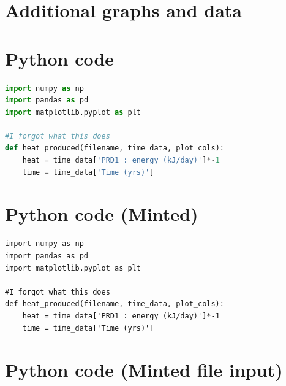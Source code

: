 \appendix
\section*{Additional graphs and data}

\section{Python code}
\begin{lstlisting}[language=Python]
import numpy as np
import pandas as pd
import matplotlib.pyplot as plt

#I forgot what this does
def heat_produced(filename, time_data, plot_cols):
    heat = time_data['PRD1 : energy (kJ/day)']*-1
    time = time_data['Time (yrs)']
\end{lstlisting}

\section{Python code (Minted)}
\begin{verbatim}
import numpy as np
import pandas as pd
import matplotlib.pyplot as plt

#I forgot what this does
def heat_produced(filename, time_data, plot_cols):
    heat = time_data['PRD1 : energy (kJ/day)']*-1
    time = time_data['Time (yrs)']
\end{verbatim}

\section{Python code (Minted file input)}
\inputminted[linenos, breaklines]{python}{resources/sort.py}
